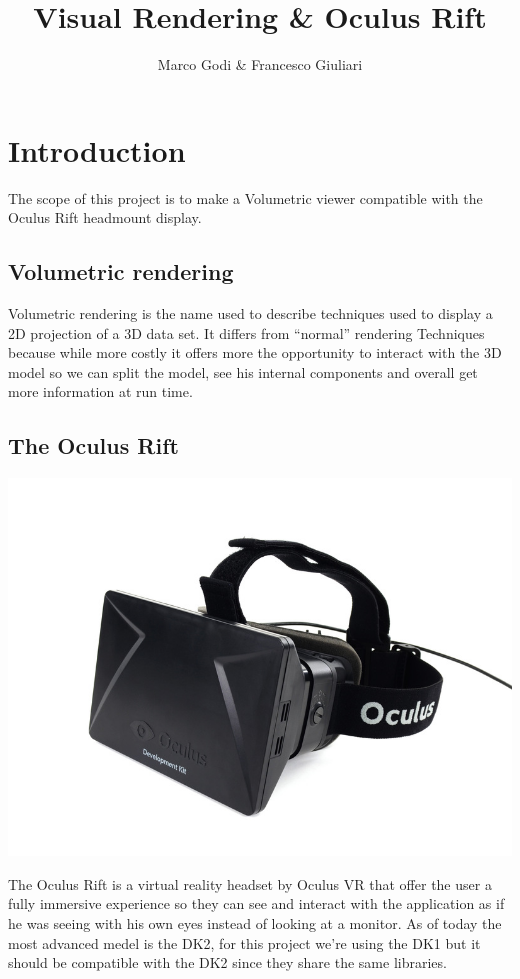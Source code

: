 \documentclass[11pt]{article} %
\title{Visual Rendering \& Oculus Rift}
\author{Marco Godi \& Francesco Giuliari}
\begin{document}
\maketitle


\tableofcontents





\newpage
\section {Introduction}
The scope of this project is to make a Volumetric viewer compatible with the Oculus Rift headmount display.

\subsection{Volumetric rendering}
Volumetric rendering is the name used to describe techniques used to display a 2D projection of a 3D data set. It differs from ``normal'' rendering Techniques because while more costly it offers more the opportunity to interact with the 3D model so we can split the model, see his internal components and overall get more information at run time.  

\subsection{The Oculus Rift}
\includegraphics[scale=0.5]{oculus.jpg}

The Oculus Rift  is a virtual reality headset by Oculus VR that offer the user a fully immersive experience so they can see and interact with the application as if he was seeing with his own eyes instead of looking at a monitor. As of today the most advanced medel is the DK2, for this project we're using the DK1 but it should be compatible with the DK2 since they share the same libraries.
\end{document}
